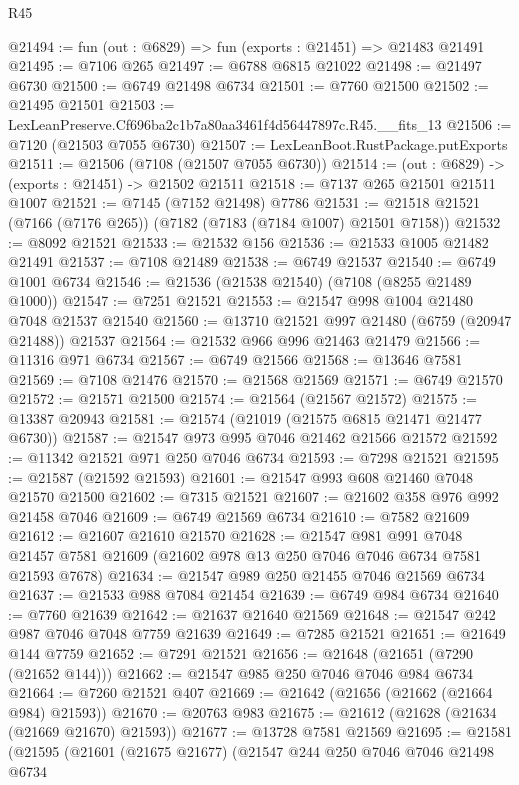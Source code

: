 \begin{lexlean}{R45}
\begin{coremodule}
{@21494 := fun (out : @6829) => fun (exports : @21451) => @21483 @21491
@21495 := @7106 @265
@21497 := @6788 @6815 @21022
@21498 := @21497 @6730
@21500 := @6749 @21498 @6734
@21501 := @7760 @21500
@21502 := @21495 @21501
@21503 := LexLeanPreserve.Cf696ba2c1b7a80aa3461f4d56447897c.R45.__fits_13
@21506 := @7120 (@21503 @7055 @6730)
@21507 := LexLeanBoot.RustPackage.putExports
@21511 := @21506 (@7108 (@21507 @7055 @6730))
@21514 := (out : @6829) -> (exports : @21451) -> @21502 @21511
@21518 := @7137 @265 @21501 @21511 @1007
@21521 := @7145 (@7152 @21498) @7786
@21531 := @21518 @21521 (@7166 (@7176 @265)) (@7182 (@7183 (@7184 @1007) @21501 @7158))
@21532 := @8092 @21521
@21533 := @21532 @156
@21536 := @21533 @1005 @21482 @21491
@21537 := @7108 @21489
@21538 := @6749 @21537
@21540 := @6749 @1001 @6734
@21546 := @21536 (@21538 @21540) (@7108 (@8255 @21489 @1000))
@21547 := @7251 @21521
@21553 := @21547 @998 @1004 @21480 @7048 @21537 @21540
@21560 := @13710 @21521 @997 @21480 (@6759 (@20947 @21488)) @21537
@21564 := @21532 @966 @996 @21463 @21479
@21566 := @11316 @971 @6734
@21567 := @6749 @21566
@21568 := @13646 @7581
@21569 := @7108 @21476
@21570 := @21568 @21569
@21571 := @6749 @21570
@21572 := @21571 @21500
@21574 := @21564 (@21567 @21572)
@21575 := @13387 @20943
@21581 := @21574 (@21019 (@21575 @6815 @21471 @21477 @6730))
@21587 := @21547 @973 @995 @7046 @21462 @21566 @21572
@21592 := @11342 @21521 @971 @250 @7046 @6734
@21593 := @7298 @21521
@21595 := @21587 (@21592 @21593)
@21601 := @21547 @993 @608 @21460 @7048 @21570 @21500
@21602 := @7315 @21521
@21607 := @21602 @358 @976 @992 @21458 @7046
@21609 := @6749 @21569 @6734
@21610 := @7582 @21609
@21612 := @21607 @21610 @21570
@21628 := @21547
    @981
    @991
    @7048
    @21457
    @7581
    @21609
    (@21602 @978 @13 @250 @7046 @7046 @6734 @7581 @21593 @7678)
@21634 := @21547 @989 @250 @21455 @7046 @21569 @6734
@21637 := @21533 @988 @7084 @21454
@21639 := @6749 @984 @6734
@21640 := @7760 @21639
@21642 := @21637 @21640 @21569
@21648 := @21547 @242 @987 @7046 @7048 @7759 @21639
@21649 := @7285 @21521
@21651 := @21649 @144 @7759
@21652 := @7291 @21521
@21656 := @21648 (@21651 (@7290 (@21652 @144)))
@21662 := @21547 @985 @250 @7046 @7046 @984 @6734
@21664 := @7260 @21521 @407
@21669 := @21642 (@21656 (@21662 (@21664 @984) @21593))
@21670 := @20763 @983
@21675 := @21612 (@21628 (@21634 (@21669 @21670) @21593))
@21677 := @13728 @7581 @21569
@21695 := @21581
    (@21595
      (@21601
        (@21675 @21677)
        (@21547
          @244
          @250
          @7046
          @7046
          @21498
          @6734
}
\end{coremodule}
\end{lexlean}
